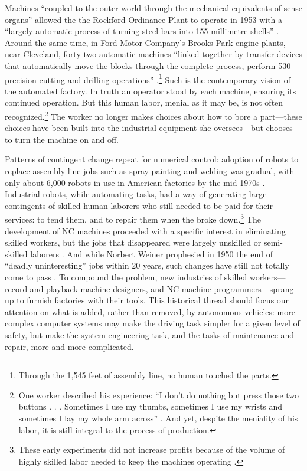 Machines ``coupled to the
outer world through the mechanical equivalents of sense organs''
allowed the the Rockford
Ordinance Plant to operate in 1953 with a ``largely automatic process of
turning steel bars into 155 millimetre
shells'' \cite{wienerMachineThreat}. Around the same time, in Ford
Motor Company's Brooks Park engine plants, near Cleveland, forty-two
automatic machines ``linked together by transfer devices that
automatically move the blocks through the complete process, perform
530 precision cutting and drilling operations'' \cite[p.
  9]{dieboldImpact}.\footnote{Through the 1,545 feet of assembly line, no human
touched the parts.} Such is the contemporary vision of the automated factory. In
truth an operator stood by each machine, ensuring its continued
operation. But this human labor, menial as it may be, is not often
recognized.\footnote{One worker described his experience: ``I don't do nothing but
press those two buttons . . . Sometimes I use my thumbs, sometimes I
use my wrists and sometimes I lay my whole arm across'' \cite[p.
  10]{dieboldImpact}. And yet,
despite the meniality of his labor, it is still integral to the
process of production.} The worker
no longer makes choices about how to bore a part---these choices have
been built into the industrial equipment 
she oversees---but chooses to turn the machine on and off.%

Patterns of contingent change repeat for
numerical control: adoption of robots to replace assembly line jobs such
as spray painting and welding was gradual, with only
about 6,000 robots in use in American factories by the mid
1970s \cite[p. 159]{nyeAmericas}. Industrial robots, while automating tasks,
had a way of generating large contingents of skilled human laborers
who still needed to be paid for their services:  to tend them, and
to repair them when the broke down.\footnote{These early experiments did not
increase profits because of the volume of highly skilled labor needed
to keep the machines operating \cite[p. 162]{nyeAmericas}.} The development of NC machines
proceeded with a specific interest in eliminating skilled workers, but
the jobs that disappeared were largely unskilled or semi-skilled
laborers \cite[p. 164]{nyeAmericas}. And while Norbert Weiner
prophesied in 1950 the end of ``deadly uninteresting'' jobs within 20
years, such changes have still not 
totally come to pass \cite[p. 161]{nyeAmericas}. To compound the problem, new industries of
skilled workers---record-and-playback machine designers, and NC machine
programmers---sprang up to furnish factories with their tools. This
historical thread should focus our attention on what is added, rather
than removed, by
autonomous vehicles: more complex computer systems may make the driving
task simpler for a given level of safety, but make the system
engineering task, and the tasks of maintenance and repair, more and more complicated.


